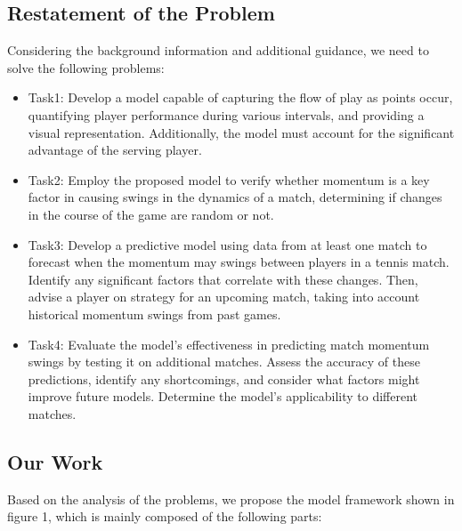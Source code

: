 \documentclass{mcmthesis}
\begin{document}
\subsection{Restatement of the Problem}
\hspace*{1em}Considering the background information %
and additional guidance, we need to solve the following problems:
\begin{itemize}
\item Task1: Develop a model capable of capturing the flow of play as points occur, %
quantifying player performance during various intervals, and providing a visual representation. %
Additionally, the model must account for the significant advantage of the serving player.
\item Task2: Employ the proposed model to verify whether momentum is a key factor in causing %
swings in the dynamics of a match, determining if changes in the course of the game are random or not.
\item Task3: Develop a predictive model using data from at least one match to forecast when the %
momentum may swings between players in a tennis match. Identify any significant factors that %
correlate with these changes. Then, advise a player on strategy for an upcoming match, %
taking into account historical momentum swings from past games.
\item Task4: Evaluate the model's effectiveness in predicting match momentum swings by %
testing it on additional matches. Assess the accuracy of these predictions, %
identify any shortcomings, and consider what factors might improve future models. %
Determine the model's applicability to different matches.
\end{itemize}

\subsection{Our Work}
\hspace*{1em} Based on the analysis of the problems, we propose the model framework shown in figure 1, %
which is mainly composed of the following parts:
\end{document}

